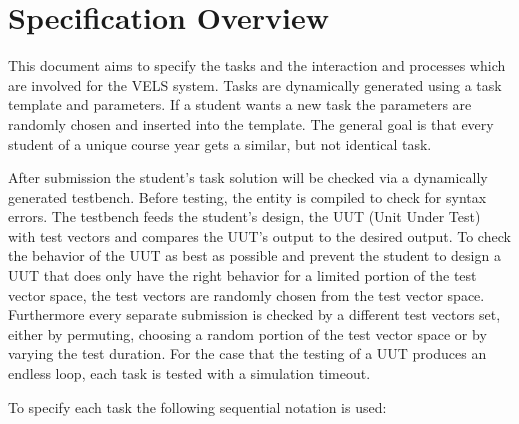 \section{Specification Overview}
This document aims to specify the tasks and the interaction and processes which are involved 
for the VELS system. Tasks are dynamically generated using a task template and parameters. 
If a student wants a new task the parameters are randomly chosen and inserted into the 
template. The general goal is that every student of a unique course year gets a similar,
but not identical task.

After submission the student's task solution will be checked via a dynamically generated testbench. 
Before testing, the entity is compiled to check for syntax errors. The testbench feeds the student's 
design, the UUT (Unit Under Test) with test vectors and compares the UUT's output to the desired output.
To check the behavior of the UUT as best as possible and prevent the student to design a UUT that 
does only have the right behavior for a limited portion of the test vector space, the test vectors are randomly
chosen from the test vector space. Furthermore every separate submission is checked by a different 
test vectors set, either by permuting, choosing a random portion of the test vector space or by varying the 
test duration. For the case that the testing of a UUT produces an endless loop, each task is tested with a simulation timeout.

To specify each task the following sequential notation is used: 


